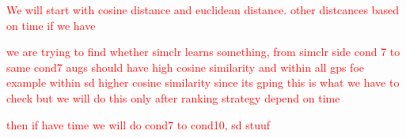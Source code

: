 \textcolor{red}{We will start with cosine distance and euclidean distance. other distcances based on time if we have}


\textcolor{red}{we are trying to find whether simclr learns something, from simclr side cond 7 to same cond7 augs should have high cosine similarity and within all
 gps foe example within sd higher cosine similarity since its gping this is what we have to check but we will do this only after ranking strategy depend on time}


 \textcolor{red}{then if have time we will do cond7 to cond10, sd stuuf}



  